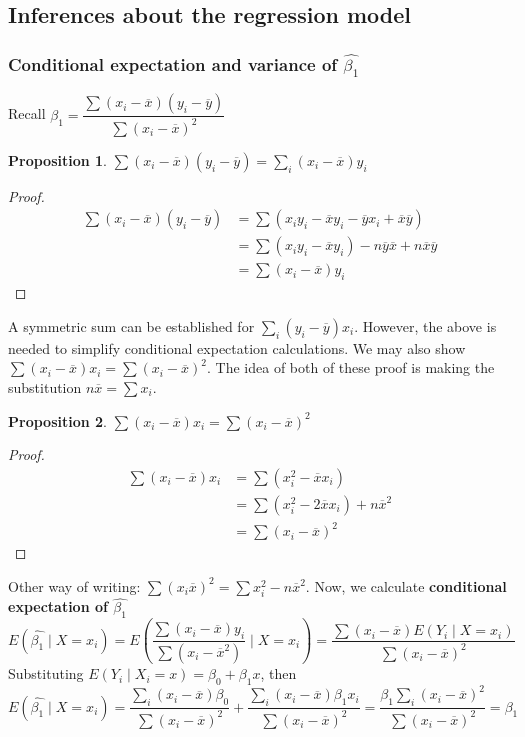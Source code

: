 \documentclass[12pt, a4paper]{article}
\theoremstyle{definition}
\newtheorem{proposition}{Proposition}
\newcommand{\ol}{\overline}
\newcommand{\f}{\frac}
\newcommand{\df}{\dfrac}
\newcommand{\BB}[1]{\left(#1\right)}
\begin{document}
	\subsection{Inferences about the regression model}
	
	\subsubsection{Conditional expectation and variance of $\hat{\beta_1}$}
	Recall $\beta_1 = \df{\sum(x_i - \ol{x})(y_i - \ol{y})}{\sum(x_i - \ol{x})^2}$
	\begin{proposition}
		$\sum(x_i - \ol{x})(y_i - \ol{y}) = \sum_i (x_i - \ol{x}) y_i$
	\end{proposition}
	\begin{proof}
		\begin{align*}
			\sum(x_i - \ol{x})(y_i - \ol{y}) &=\sum ( x_i y_i - \ol{x} y_i - \ol{y} x_i + \ol{x}\ol{y}) \\
			&= \sum ( x_i y_i - \ol{x} y_i) - n \ol{y} \ol{x} + n\ol{x}\ol{y} \\
			&= \sum ( x_i - \ol{x})y_i
		\end{align*}
	\end{proof}
	A symmetric sum can be established for $\sum_i (y_i - \ol{y}) x_i$. However, the above is needed to simplify conditional expectation calculations. We may also show $\sum ( x_i - \ol{x})x_i = \sum (x_i - \ol{x})^2$. The idea of both of these proof is making the substitution $n\ol{x} = \sum x_i$.
	\begin{proposition}
		$\sum ( x_i - \ol{x})x_i = \sum (x_i - \ol{x})^2$
	\end{proposition}
	\begin{proof}
		\begin{align*}
			\sum (x_i - \ol{x})x_i &=  \sum (x_i^2 - \ol{x}x_i)\\
			&= \sum (x_i^2 - 2\ol{x}x_i) + n\ol{x}^2\\
			&= \sum (x_i - \ol{x})^2
		\end{align*}
	\end{proof}
	Other way of writing: $\sum (x_i \ol{x})^2 = \sum x_i^2 - n\ol{x}^2$. Now, we calculate {\bf conditional expectation of $\hat{\beta_1}$}
		$$
			E(\hat{\beta_1} \mid X = x_i) = E\BB{\f{
					\sum(x_i - \ol{x})y_i}{
					\sum(x_i - \ol{x}^2)
				}
			\mid X = x_i
			} 
		= \f{
			\sum (x_i - \ol{x})E(Y_i \mid X = x_i)
		}{
			\sum (x_i - \ol{x})^2
		}
		$$
		Substituting $E(Y_i \mid X_i = x) = \beta_0 + \beta_1 x$, then
		$$
			E(\hat{\beta_1} \mid X = x_i) = 
		\f{
				\sum_i (x_i - \ol{x}) \beta_0 
		}{
			\sum (x_i - \ol{x})^2
		} 
		+ \f{
			\sum_i (x_i - \ol{x}) \beta_1 x_i
		}{
			\sum (x_i - \ol{x})^2
		} = \f{
			 \beta_1 \sum_i (x_i - \ol{x})^2
		}{
			\sum (x_i - \ol{x})^2 
		} = \beta_1
		$$
\end{document}
